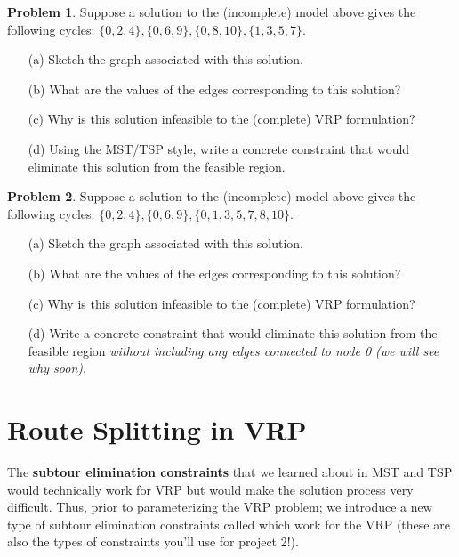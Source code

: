 \documentclass[11pt]{article}
\theoremstyle{definition}
\newtheorem{problem}{Problem}
\begin{document}
\newpage

\begin{problem}
Suppose a solution to the (incomplete) model above  gives the following cycles: $\{0,2,4\}, \{0,6,9\}, \{0,8,10\}, \{1,3,5,7\}$.
	\begin{enumerate}
	\item[(a)] Sketch the graph associated with this solution. \vfill
	\item[(b)] What are the values of the edges corresponding to this solution? 
	\vfill
	\item[(c)] Why is this solution infeasible to the (complete) VRP formulation? 
	\vfill
	\item[(d)] Using the MST/TSP style, write a concrete constraint that would eliminate this solution from the feasible region. \vfill
	\end{enumerate}
\end{problem}

\newpage

\begin{problem}
Suppose a solution to the (incomplete) model above  gives the following cycles: $\{0,2,4\}, \{0,6,9\}, \{0,1,3,5,7,8,10\}$.
	\begin{enumerate}
	\item[(a)] Sketch the graph associated with this solution. \vfill
	\item[(b)] What are the values of the edges corresponding to this solution? 
	\vfill
	\item[(c)] Why is this solution infeasible to the (complete) VRP formulation? 
	\vfill
	\item[(d)] Write a concrete constraint that would eliminate this solution from the feasible region \emph{without including any edges connected to node 0 (we will see why soon)}.
	\end{enumerate}
\end{problem}
\vfill
\newpage

\section{Route Splitting in VRP}

The \textbf{subtour elimination constraints} that we learned about in MST and TSP would technically work for VRP but would make the solution process very difficult. Thus, prior to parameterizing the VRP problem; we introduce a new type of subtour elimination constraints called which work for the VRP (these are also the types of constraints you'll use for project 2!).
\end{document}

